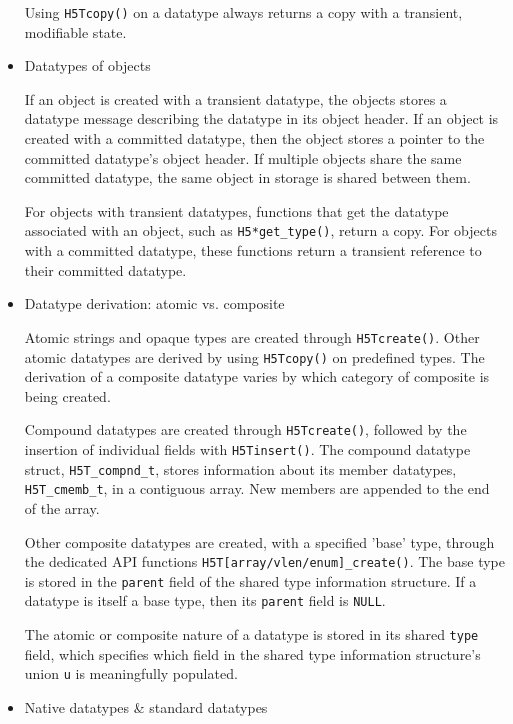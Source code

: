 \begin{itemize}
Using \texttt{H5Tcopy()} on a datatype always returns a copy with a transient, modifiable state.

    \item Datatypes of objects

If an object is created with a transient datatype, the objects stores a datatype message describing the datatype in its object header. If an object is created with a committed datatype, then the object stores a pointer to the committed datatype's object header. If multiple objects share the same committed datatype, the same object in storage is shared between them.

For objects with transient datatypes, functions that get the datatype associated with an object, such as \texttt{H5*get\_type()}, return a copy. For objects with a committed datatype, these functions return a transient reference to their committed datatype.

    \item Datatype derivation: atomic vs. composite

Atomic strings and opaque types are created through \texttt{H5Tcreate()}. Other atomic datatypes are derived by using \texttt{H5Tcopy()} on predefined types. The derivation of a composite datatype varies by which category of composite is being created. 

Compound datatypes are created through \texttt{H5Tcreate()}, followed by the insertion of individual fields with \texttt{H5Tinsert()}. The compound datatype struct, \texttt{H5T\_compnd\_t}, stores information about its member datatypes, \texttt{H5T\_cmemb\_t}, in a contiguous array. New members are appended to the end of the array. %

Other composite datatypes are created, with a specified 'base' type, through the dedicated API functions \texttt{H5T[array/vlen/enum]\_create()}. The base type is stored in the \texttt{parent} field of the shared type information structure. If a datatype is itself a base type, then its \texttt{parent} field is \texttt{NULL}.

The atomic or composite nature of a datatype is stored in its shared \texttt{type} field, which specifies which field in the shared type information structure's union \texttt{u} is meaningfully populated.

    \item Native datatypes \& standard datatypes


\end{itemize}
